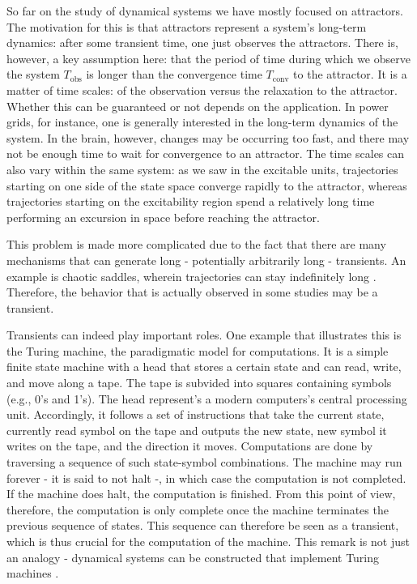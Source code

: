 So far on the study of dynamical systems we have mostly focused on attractors. The motivation for this is that attractors represent a system's long-term dynamics: after some transient time, one just observes the attractors. There is, however, a key assumption here: that the period of time during which we observe the system $T_\mathrm{obs}$ is longer than the convergence time $T_\mathrm{conv}$ to the attractor. It is a matter of time scales: of the observation versus the relaxation to the attractor. Whether this can be guaranteed or not depends on the application. In power grids, for instance, one is generally interested in the long-term dynamics of the system. In the brain, however, changes may be occurring too fast, and there may not be enough time to wait for convergence to an attractor. The time scales can also vary within the same system: as we saw in the excitable units, trajectories starting on one side of the state space converge rapidly to the attractor, whereas trajectories starting on the excitability region spend a relatively long time performing an excursion in space before reaching the attractor.

This problem is made more complicated due to the fact that there are many mechanisms that can generate long - potentially arbitrarily long - transients. An example is chaotic saddles, wherein trajectories can stay indefinitely long \cite{lai2009transient}. Therefore, the behavior that is actually observed in some studies may be a transient. 

Transients can indeed play important roles. One example that illustrates this is the Turing machine, the paradigmatic model for computations. It is a simple finite state machine with a head that stores a certain state and can read, write, and move along a tape. The tape is subvided into squares containing symbols (e.g., 0's and 1's). The head represent's a modern computers's central processing unit. Accordingly, it follows a set of instructions that take the current state, currently read symbol on the tape and outputs the new state, new symbol it writes on the tape, and the direction it moves. Computations are done by traversing a sequence of such state-symbol combinations. The machine may run forever - it is said to not halt -, in which case the computation is not completed. If the machine does halt, the computation is finished. From this point of view, therefore, the computation is only complete once the machine terminates the previous sequence of states. This sequence can therefore be seen as a transient, which is thus crucial for the computation of the machine. This remark is not just an analogy - dynamical systems can be constructed that implement Turing machines \cite{postlethwaite2024a}.

